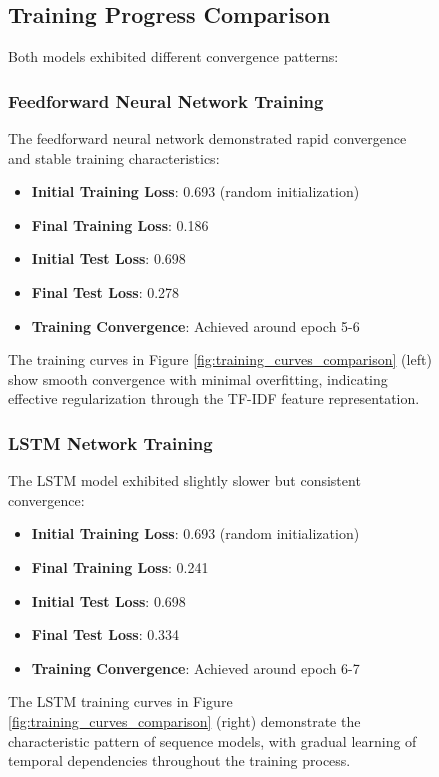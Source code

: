 \documentclass[a4paper, journal]{IEEEtran}
\begin{document}
\begin{figure}[!t]
\subsection{Training Progress Comparison}

Both models exhibited different convergence patterns:

\subsubsection{Feedforward Neural Network Training}

The feedforward neural network demonstrated rapid convergence and stable training characteristics:

\begin{itemize}
    \item \textbf{Initial Training Loss}: 0.693 (random initialization)
    \item \textbf{Final Training Loss}: 0.186
    \item \textbf{Initial Test Loss}: 0.698
    \item \textbf{Final Test Loss}: 0.278
    \item \textbf{Training Convergence}: Achieved around epoch 5-6
\end{itemize}

The training curves in Figure \ref{fig:training_curves_comparison} (left) show smooth convergence with minimal overfitting, indicating effective regularization through the TF-IDF feature representation.

\subsubsection{LSTM Network Training}

The LSTM model exhibited slightly slower but consistent convergence:

\begin{itemize}
    \item \textbf{Initial Training Loss}: 0.693 (random initialization)
    \item \textbf{Final Training Loss}: 0.241
    \item \textbf{Initial Test Loss}: 0.698
    \item \textbf{Final Test Loss}: 0.334
    \item \textbf{Training Convergence}: Achieved around epoch 6-7
\end{itemize}

The LSTM training curves in Figure \ref{fig:training_curves_comparison} (right) demonstrate the characteristic pattern of sequence models, with gradual learning of temporal dependencies throughout the training process.


\end{figure}
\end{document}
